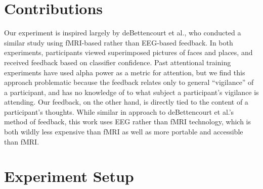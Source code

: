 \documentclass[12pt]{report}
\begin{document}
\chapter{Contributions}
	Our experiment is inspired largely by deBettencourt et al.\cite{deBettencourt}, 	who conducted a similar study using fMRI-based rather than EEG-based feedback.  In both experiments, participants viewed superimposed pictures of faces and places, and received feedback based on classifier confidence.  Past attentional training experiments have used alpha power as a metric for attention, but we find this approach problematic because the feedback relates only to general “vigilance” of a participant, and has no knowledge of to what subject a participant’s vigilance is attending.  Our feedback, on the other hand, is directly tied to the content of a participant’s thoughts.
	While similar in approach to deBettencourt et al.'s method of feedback, this work uses EEG rather than fMRI technology, which is both wildly less expensive than fMRI as well as more portable and accessible than fMRI.

\chapter{Experiment Setup}
\end{document}
